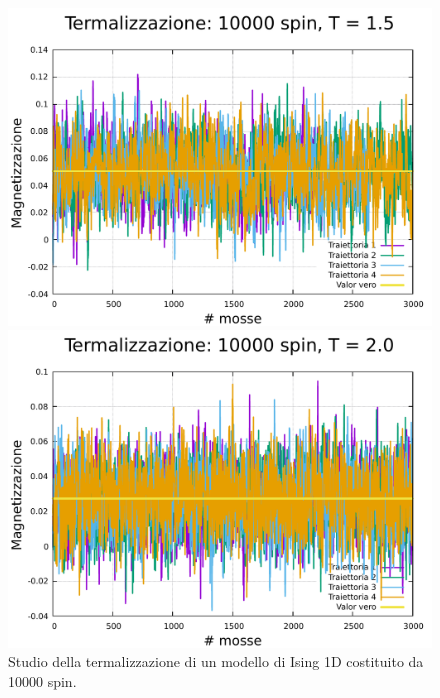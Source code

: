 \begin{figure}[htbp]
    \begin{minipage}{0.45\textwidth}  
      \centering
      \includegraphics[page=1, width=\textwidth]{Immagini/simIsing1D/magn0.02/term/term_10000_1.5.pdf}
      \caption{$T\,=\,1.5$}
    \end{minipage}\hfill
    \begin{minipage}{0.45\textwidth}  
      \centering
      \includegraphics[page=1, width=\textwidth]{Immagini/simIsing1D/magn0.02/term/term_10000_2.0.pdf}
      \caption{$T\,=\,2.0$}
    \end{minipage}
    \caption{Studio della termalizzazione di un modello di Ising 1D costituito da 10000 spin.}
\end{figure}

